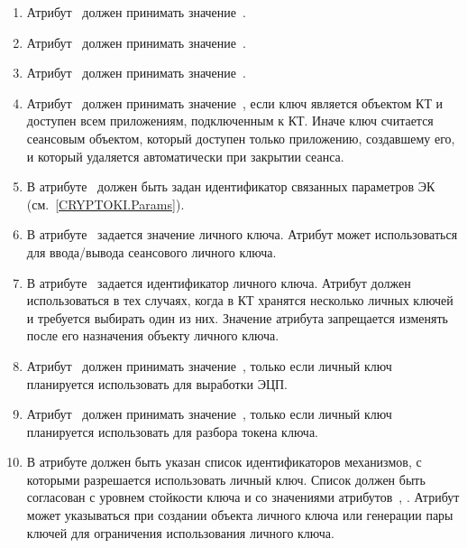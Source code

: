 \begin{enumerate}
\item
Атрибут~ должен принимать значение~.

\item
Атрибут~ должен принимать значение~.

\item
Атрибут~ должен принимать значение~.

\item
Атрибут~ должен принимать значение~,
если ключ является объектом КТ и доступен всем приложениям,
подключенным к КТ. 
%
Иначе ключ считается сеансовым объектом, который доступен только
приложению, создавшему его, и который удаляется автоматически при закрытии 
сеанса.

\item
В атрибуте~ должен быть задан идентификатор связанных
параметров ЭК (см.~\ref{CRYPTOKI.Params}).

\item
В атрибуте~ задается значение личного ключа.
Атрибут может использоваться для ввода/вывода сеансового личного ключа.

\item
В атрибуте~ задается идентификатор личного ключа.
Атрибут должен использоваться в тех случаях, когда в КТ
хранятся несколько личных ключей и требуется выбирать один из них. 
%
Значение атрибута  запрещается изменять
после его назначения объекту личного ключа.

\item
Атрибут~ должен принимать значение~,
только если личный ключ планируется использовать для выработки ЭЦП.

\item
Атрибут~ должен принимать значение~,
только если личный ключ планируется использовать для разбора
токена ключа.

\item
В атрибуте  должен быть указан список 
идентификаторов механизмов, с которыми разрешается использовать личный 
ключ. Список должен быть согласован с уровнем стойкости ключа и со 
значениями атрибутов~, . 
%
Атрибут может указываться при создании объекта личного ключа 
или генерации пары ключей для ограничения использования личного ключа. 


\end{enumerate}
